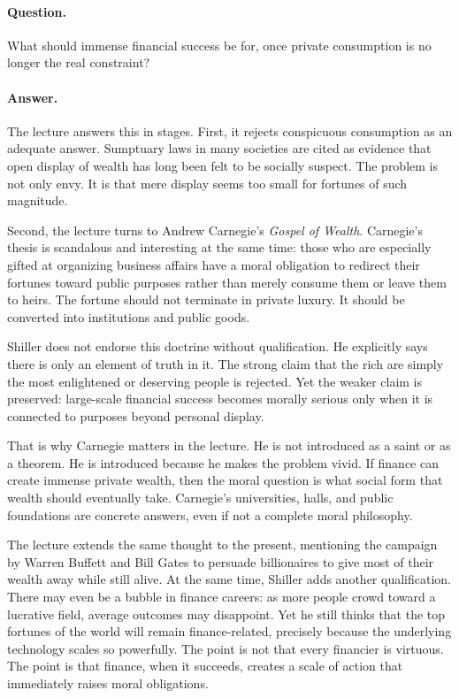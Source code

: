 \paragraph{Question.}
What should immense financial success be for, once private consumption is no longer the real constraint?

\paragraph{Answer.}
The lecture answers this in stages. First, it rejects conspicuous consumption as an adequate answer. Sumptuary laws in many societies are cited as evidence that open display of wealth has long been felt to be socially suspect. The problem is not only envy. It is that mere display seems too small for fortunes of such magnitude.

Second, the lecture turns to Andrew Carnegie's \emph{Gospel of Wealth}. Carnegie's thesis is scandalous and interesting at the same time: those who are especially gifted at organizing business affairs have a moral obligation to redirect their fortunes toward public purposes rather than merely consume them or leave them to heirs. The fortune should not terminate in private luxury. It should be converted into institutions and public goods.

Shiller does not endorse this doctrine without qualification. He explicitly says there is only an element of truth in it. The strong claim that the rich are simply the most enlightened or deserving people is rejected. Yet the weaker claim is preserved: large-scale financial success becomes morally serious only when it is connected to purposes beyond personal display.

That is why Carnegie matters in the lecture. He is not introduced as a saint or as a theorem. He is introduced because he makes the problem vivid. If finance can create immense private wealth, then the moral question is what social form that wealth should eventually take. Carnegie's universities, halls, and public foundations are concrete answers, even if not a complete moral philosophy.

The lecture extends the same thought to the present, mentioning the campaign by Warren Buffett and Bill Gates to persuade billionaires to give most of their wealth away while still alive. At the same time, Shiller adds another qualification. There may even be a bubble in finance careers: as more people crowd toward a lucrative field, average outcomes may disappoint. Yet he still thinks that the top fortunes of the world will remain finance-related, precisely because the underlying technology scales so powerfully. The point is not that every financier is virtuous. The point is that finance, when it succeeds, creates a scale of action that immediately raises moral obligations.

